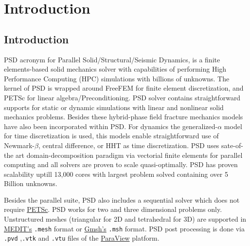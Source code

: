 \chapter{Introduction} 

\section{Introduction} 
PSD acronym for Parallel Solid/Structural/Seismic Dynamics, is a finite elements-based solid mechanics solver with capabilities of performing High Performance Computing (HPC) simulations with billions of unknowns. The kernel of PSD is wrapped around FreeFEM for finite element discretization, and PETSc for linear algebra/Preconditioning. PSD solver contains straightforward supports for static or dynamic simulations with linear  and nonlinear solid mechanics problems. Besides these hybrid-phase field fracture mechanics models have also been incorporated within PSD. For dynamics the generalized-$\alpha$ model  for time discretization is used, this models enable straightforward use of Newmark-$\beta$, central difference, or HHT as time discretization. PSD uses sate-of-the art domain-decomposition paradigm via vectorial finite elements for parallel computing and all solvers are  proven to scale quasi-optimally. PSD has proven scalability uptill 13,000 cores with largest problem solved containing over 5 Billion unknowns. 

Besides the parallel suite, PSD also includes a sequential solver which does not require \href{https://www.mcs.anl.gov/petsc/}{PETSc}.
PSD works for two and three dimensional problems only. Unstructured
meshes (triangular for 2D and tetrahedral for 3D) are supported in
\href{https://www.ljll.math.upmc.fr/frey/software.html}{MEDIT's}
\lstinline!.mesh! format or \href{http://gmsh.info/}{Gmsh's}
\lstinline!.msh! format. PSD post processing is done via
\lstinline!.pvd! ,\lstinline!.vtk! and \lstinline!.vtu! files of the
\href{https://www.paraview.org/}{ParaView} platform.

{

}
\pagebreak

